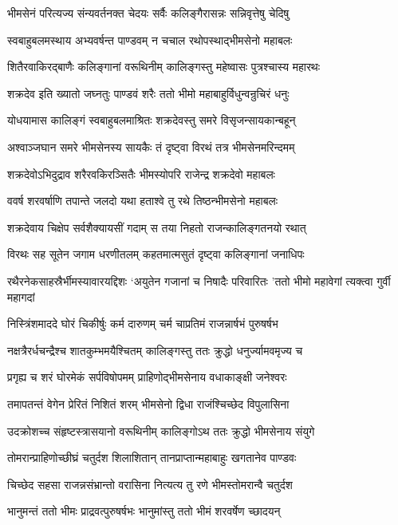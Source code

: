 \twolineshloka
{भीमसेनं परित्यज्य संन्यवर्तनक्त चेदयः}
{सर्वैः कलिङ्गैरासन्नः सन्निवृत्तेषु चेदिषु}


\twolineshloka
{स्वबाहुबलमस्थाय अभ्यवर्षन्त पाण्डवम्}
{न चचाल रथोपस्थाद्भीमसेनो महाबलः}


\twolineshloka
{शितैरवाकिरद्बाणैः कलिङ्गानां वरूथिनीम्}
{कालिङ्गस्तु महेष्वासः पुत्रश्चास्य महारथः}


\twolineshloka
{शक्रदेव इति ख्यातो जघ्नतुः पाण्डवं शरैः}
{ततो भीमो महाबाहुर्विधुन्वन्रुचिरं धनुः}


\twolineshloka
{योधयामास कालिङ्गं स्वबाहुबलमाश्रितः}
{शक्रदेवस्तु समरे विसृजन्सायकान्बहून्}


\twolineshloka
{अश्वाञ्जघान समरे भीमसेनस्य सायकैः}
{तं दृष्ट्वा विरथं तत्र भीमसेनमरिन्दमम्}


\twolineshloka
{शक्रदेवोऽभिदुद्राव शरैरवकिरञ्सितैः}
{भीमस्योपरि राजेन्द्र शक्रदेवो महाबलः}


\twolineshloka
{ववर्ष शरवर्षाणि तपान्ते जलदो यथा}
{हताश्वे तु रथे तिष्ठन्भीमसेनो महाबलः}


\twolineshloka
{शक्रदेवाय चिक्षेप सर्वशैक्यायसीं गदाम्}
{स तया निहतो राजन्कालिङ्गतनयो रथात्}


\twolineshloka
{विरथः सह सूतेन जगाम धरणीतलम्}
{कहतमात्मसुतं दृष्ट्वा कलिङ्गानां जनाधिपः}


\threelineshloka
{रथैरनेकसाहस्रैर्भीमस्यावारयद्दिशः}
{`अयुतेन गजानां च निषादैः परिवारितः}
{'ततो भीमो महावेगां त्यक्त्वा गुर्वी महागदां}


\twolineshloka
{निस्त्रिंशमाददे घोरं चिकीर्षुः कर्म दारुणम्}
{चर्म चाप्रतिमं राजन्नार्षभं पुरुषर्षभ}


\twolineshloka
{नक्षत्रैरर्धचन्द्रैश्च शातकुम्भमयैश्चितम्}
{कालिङ्गस्तु ततः क्रुद्धो धनुर्ज्यामवमृज्य च}


\twolineshloka
{प्रगृह्य च शरं घोरमेकं सर्पविषोपमम्}
{प्राहिणोद्भीमसेनाय वधाकाङ्क्षी जनेश्वरः}


\twolineshloka
{तमापतन्तं वेगेन प्रेरितं निशितं शरम्}
{भीमसेनो द्विधा राजंश्चिच्छेद विपुलासिना}


\twolineshloka
{उदक्रोशच्च संहृष्टस्त्रासयानो वरूथिनीम्}
{कालिङ्गोऽथ ततः क्रुद्धो भीमसेनाय संयुगे}


\twolineshloka
{तोमरान्प्राहिणोच्छीघ्रं चतुर्दश शिलाशितान्}
{तानप्राप्तान्महाबाहुः खगतानेव पाण्डवः}


\twolineshloka
{चिच्छेद सहसा राजन्नसंभ्रान्तो वरासिना}
{नित्यत्य तु रणे भीमस्तोमरान्वै चतुर्दश}


\twolineshloka
{भानुमन्तं ततो भीमः प्राद्रवत्पुरुषर्षभः}
{भानुमांस्तु ततो भीमं शरवर्षेण च्छादयन्}


